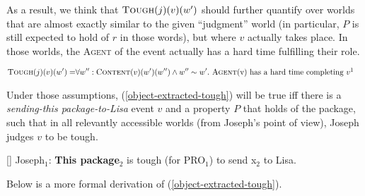 \documentclass[11pt]{article}
\begin{document}
As a result, we think that $\textsc{Tough}(j)(v)(w')$ should further quantify over worlds that are almost exactly similar to the given ``judgment'' world (in particular, $P$ is still expected to hold of $r$ in those words), but where $v$ actually takes place. In those worlds, the \textsc{Agent} of the event actually has a hard time fulfilling their role.

\begin{align*}
	\textsc{Tough}(j)(v)(w') = &\forall w'' : \textsc{Content}(v)(w')(w'') \wedge w'' \sim w'. \ \text{\textsc{Agent}(v) has a hard time completing $v$}\footnotemark
\end{align*}



Under those assumptions, (\ref{object-extracted-tough}) will be true iff there is a \textit{sending-this package-to-Lisa} event $v$ and a property $P$ that holds of the package, such that in all relevantly accessible worlds (from Joseph's point of view), Joseph judges $v$ to be tough.
\begin{exe}
		 [] {Joseph$_1$: \textbf{This package$_2$} is tough (for PRO$_1$) to send x$_2$ to Lisa.}
\end{exe} Below is a more formal derivation of (\ref{object-extracted-tough}).

\iffalse
	\begin{align*}
		\llbracket (\ref{object-extracted-tough})  \rrbracket
		&\stackrel{PM}{=} \exists v_\nu. \ \lambda w_s. \ \llbracket \text{tough} \rrbracket\llbracket \text{J$_j$} \rrbracket\llbracket \text{this package} \rrbracket(v)(w) \wedge \llbracket \text{for PRO$_j$ to send this package to L} \rrbracket(v)(w)\\
		&\stackrel{PM}{=} \exists v_\nu. \ \lambda w_s. \ \llbracket \text{tough} \rrbracket\llbracket \text{J} \rrbracket\llbracket \text{this package} \rrbracket(v)(w) \wedge \text{\textsc{Content}}(v)(w) = \text{J sends this package to L} \rrbracket(v)(w)\\
		&\stackrel{FA}{=} \lambda e. \ \lambda w. \ \llbracket \text{tough} \rrbracket (Suzi)(e)(w) \wedge \llbracket \text{Suzi please Joseph} \rrbracket(e)(w)\\
		&\stackrel{FA}{=} \lambda e. \ \lambda w. \ \text{\textsc{Tough}}(e)(w)(Suzi) \\
	\end{align*}\fi
\end{document}
